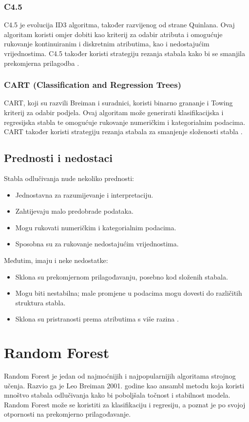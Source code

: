 \documentclass[zavrsnirad]{fer}
\begin{document}
\subsubsection{C4.5}
C4.5 je evolucija ID3 algoritma, također razvijenog od strane Quinlana. Ovaj algoritam koristi omjer dobiti kao kriterij za odabir atributa i omogućuje rukovanje kontinuiranim i diskretnim atributima, kao i nedostajućim vrijednostima. C4.5 također koristi strategiju rezanja stabala kako bi se smanjila prekomjerna prilagodba \cite{singh2014}.

\subsubsection{CART (Classification and Regression Trees)}
CART, koji su razvili Breiman i suradnici, koristi binarno grananje i Towing kriterij za odabir podjela. Ovaj algoritam može generirati klasifikacijska i regresijska stabla te omogućuje rukovanje numeričkim i kategorialnim podacima. CART također koristi strategiju rezanja stabala za smanjenje složenosti stabla \cite{singh2014}.


\subsection{Prednosti i nedostaci}
Stabla odlučivanja nude nekoliko prednosti:
\begin{itemize}
	\item Jednostavna za razumijevanje i interpretaciju.
	\item Zahtijevaju malo predobrade podataka.
	\item Mogu rukovati numeričkim i kategorialnim podacima.
	\item Sposobna su za rukovanje nedostajućim vrijednostima.
\end{itemize}

Međutim, imaju i neke nedostatke:
\begin{itemize}
	\item Sklona su prekomjernom prilagođavanju, posebno kod složenih stabala.
	\item Mogu biti nestabilna; male promjene u podacima mogu dovesti do različitih struktura stabla.
	\item Sklona su pristranosti prema atributima s više razina \cite{Charbuty_Abdulazeez_2021}\cite{somvanshi2016}.
\end{itemize}



\section{Random Forest}
Random Forest je jedan od najmoćnijih i najpopularnijih algoritama strojnog učenja. Razvio ga je Leo Breiman 2001. godine kao ansambl metodu koja koristi mnoštvo stabala odlučivanja kako bi poboljšala točnost i stabilnost modela. Random Forest može se koristiti za klasifikaciju i regresiju, a poznat je po svojoj otpornosti na prekomjerno prilagođavanje.
\end{document}
